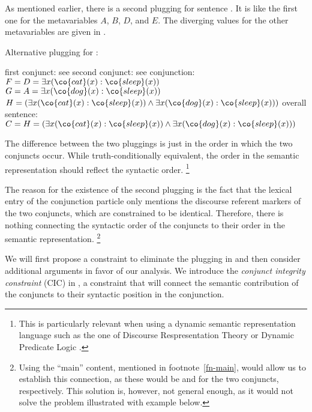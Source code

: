 \documentclass[output=paper]{langsci/langscibook}
\begin{document}
As mentioned earlier, there is a second plugging for sentence . It is like the first one for the metavariables $A$, $B$, $D$, and $E$. The diverging values for the other metavariables are given in .

\ea 
Alternative plugging for : \label{hund-katze-schlaf-plug2}
\begin{xlist}
\ex first conjunct: see 
\ex second conjunct: see 
\ex conjunction:\\
$F = D = \exists x (\co{cat}(x) : \co{sleep}(x))$\\
$G = A = \exists x (\co{dog}(x) : \co{sleep}(x))$\\
$H = (\exists x (\co{cat}(x) : \co{sleep}(x)) \land \exists x (\co{dog}(x) : \co{sleep}(x)))$
\ex overall sentence:\\
$C = H = (\exists x (\co{cat}(x) : \co{sleep}(x)) \land \exists x (\co{dog}(x) : \co{sleep}(x)))$
\end{xlist}
\z

The difference between the two pluggings is just in the order in which the two conjuncts occur. While truth-conditionally equivalent, the order in the semantic representation should reflect the syntactic order.%
\footnote{This is particularly relevant when using a dynamic semantic representation language such as the one of Discourse Respresentation Theory \citep{Kamp:Reyle:93} or Dynamic Predicate Logic \citep{Groenendijk:Stokhof:91}.}

The reason for the existence of the second plugging is the fact that the lexical entry of the conjunction particle only mentions the discourse referent markers of the two conjuncts, which are constrained to be identical. Therefore, there is nothing connecting the syntactic order of the conjuncts to their order in the semantic representation.%
\footnote{Using the ``main'' content, mentioned in footnote~\ref{fn-main}, would allow us to establish this connection, as these would be  and  for the two conjuncts, respectively. This solution is, however, not general enough, as it would not solve the problem illustrated with example  below.}

We will first propose a constraint to eliminate the plugging in 
 and then consider additional arguments in favor of our analysis. 
We introduce the \emph{conjunct integrity constraint} (CIC)
in , a constraint that will connect the semantic contribution of the conjuncts to their syntactic position in the conjunction.
\end{document}
